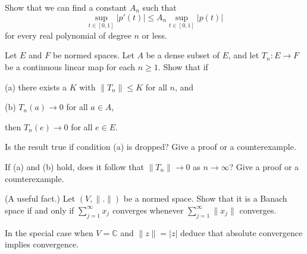 \begin{exercise}\label{C1.3} 
Show that we can find a constant $A_{n}$ such that
\[\sup_{t\in[0,1]}|p'(t)|\leq A_{n}\sup_{t\in[0,1]}|p(t)|\]
for every real polynomial of degree $n$ or less.
\end{exercise}
\begin{exercise}\label{C1.4} Let $E$ and $F$ be normed spaces. 
Let $A$ be a dense subset of $E$,
and let
$T_{n}:E\rightarrow F$ be a continuous linear map for each $n\geq 1$.
Show that if

(a) there exists a $K$ with $\|T_{n}\|\leq K$ for all $n$, and

(b) $T_{n}(a)\rightarrow 0$ for all $a\in A$,

\noindent then $T_{n}(e)\rightarrow 0$ for all $e\in E$.

Is the  result true if condition (a) is  dropped? Give a proof or
a counterexample.

If (a) and (b) hold, does it follow that $\|T_{n}\|\rightarrow 0$
as $n\rightarrow\infty$? Give a proof or
a counterexample.
\end{exercise}
\begin{exercise}\label{C1.5}  
(A useful fact.) Let $(V,\|.\|)$ be a normed space.
Show that it is a Banach space if and only if $\sum_{j=1}^{\infty}x_{j}$
converges whenever
$\sum_{j=1}^{\infty}\|x_{j}\|$ converges.

In the special case when $V={\mathbb C}$ and $\|z\|=|z|$ deduce
that absolute convergence implies convergence.
\end{exercise} 

